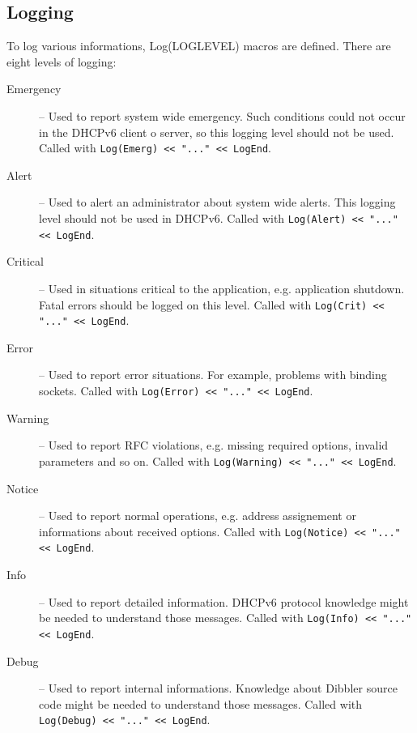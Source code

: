 \subsection{Logging}
To log various informations, Log(LOGLEVEL) macros are defined. There
are eight levels of logging:
\begin{description}
\item[Emergency] -- Used to report system wide emergency. Such
  conditions could not occur in the DHCPv6 client o server, so this
  logging level should not be used. Called with
  \verb+Log(Emerg) << "..." << LogEnd+.

\item[Alert] -- Used to alert an administrator about system wide
  alerts. This logging level should not be used in DHCPv6. 
  Called with \verb+Log(Alert) << "..." << LogEnd+.

\item[Critical] -- Used in situations critical to the application,
  e.g. application shutdown. Fatal errors should be logged on this
  level. Called with \verb+Log(Crit) << "..." << LogEnd+.

\item[Error] -- Used to report error situations. For example, problems
  with binding sockets. Called with \verb+Log(Error) << "..." << LogEnd+.

\item[Warning] -- Used to report RFC violations, e.g. missing required
  options, invalid parameters and so on. Called with \verb+Log(Warning) << "..." << LogEnd+.

\item[Notice] -- Used to report normal operations, e.g. address
 assignement or informations about received options. Called with
 \verb+Log(Notice) << "..." << LogEnd+.

\item[Info] -- Used to report detailed information. DHCPv6 protocol
  knowledge might be needed to understand those messages.
  Called with \verb+Log(Info) << "..." << LogEnd+.

\item[Debug] -- Used to report internal informations. Knowledge about
  Dibbler source code might be needed to understand those messages.
  Called with \verb+Log(Debug) << "..." << LogEnd+.
\end{description}


